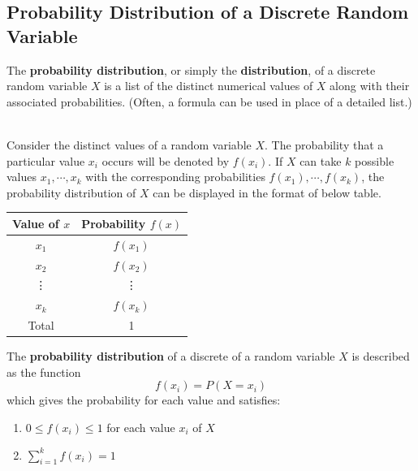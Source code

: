 \documentclass[12pt,a4paper]{article}
\newcommand{\dispsty}{\displaystyle}
\begin{document}
\subsection{Probability Distribution of a Discrete Random Variable}

\begin{tcolorbox}[colback=white]
	The \textbf{probability distribution}, or simply the \textbf{distribution}, of a discrete random variable $X$ is a list of the distinct numerical values of $X$ along with their associated probabilities. (Often, a formula can be used in place of a detailed list.)
\end{tcolorbox}\
\\
Consider the distinct values of a random variable $X$. The probability that a particular value $x_i$ occurs will be denoted by $f(x_i)$. If $X$ can take $k$ possible values $x_1,\cdots,x_k$ with the corresponding probabilities $f(x_1), \cdots, f(x_k)$, the probability distribution of $X$ can be displayed in the format of below table. \begin{center}\begin{tabular}{c|c}
		\toprule[1.2pt]
		Value of $x$ & Probability $f(x)$ \\
		\hline
		$x_1$ & $f(x_1)$ \\
		$x_2$ & $f(x_2)$ \\
		\vdots & \vdots \\
		$x_k$ & $f(x_k)$ \\
		\hline
		Total & 1 \\
		\bottomrule[1.2pt]
	\end{tabular}
\end{center}

\begin{tcolorbox}[colback=white]
	The \textbf{probability distribution} of a discrete of a random variable $X$ is described as the function \[
	f(x_i) = P(X=x_i)
	\] which gives the probability for each value and satisfies: \begin{enumerate}
		\item $0\leq f(x_i)\leq 1$ for each value $x_i$ of $X$
		\item \(\dispsty\sum_{i=1}^kf(x_i)=1 \)
	\end{enumerate}
\end{tcolorbox}
\end{document}
